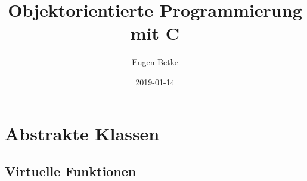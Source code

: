 \documentclass[a4paper]{article}
\title{Objektorientierte Programmierung mit C}
\author{Eugen Betke}
\date{2019-01-14}
\begin{document}
\maketitle

\tableofcontents

%
%
%

%





\section{Abstrakte Klassen}
\subsection{Virtuelle Funktionen}










\end{document}
